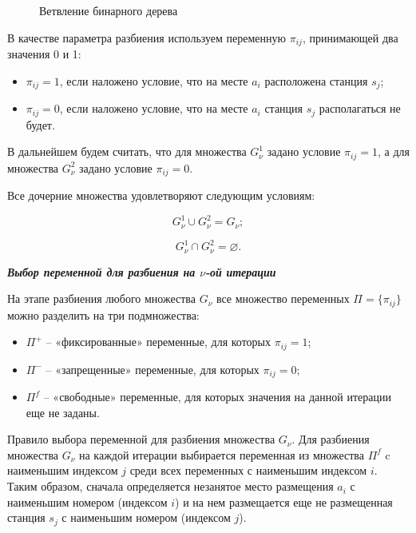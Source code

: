 \begin{figure}[ht]
  \caption{Ветвление бинарного дерева}\label{fig:part2_bst_child_nodes}
\end{figure}

В качестве параметра разбиения используем переменную $\pi_{ij}$, принимающей два значения 0 и 1:

\begin{itemize}
    \item $\pi_{ij}=1$, если наложено условие, что на месте $a_i$ расположена станция $s_j$;
    \item $\pi_{ij} = 0$, если наложено условие, что на месте $a_i$ станция $s_j$  располагаться не будет.
\end{itemize}

В дальнейшем будем считать, что для множества $G^1_\nu$ задано условие $\pi_{ij}=1$, а для множества $G^2_\nu$  задано условие $\pi_{ij} = 0$.

Все дочерние множества удовлетворяют следующим условиям:

\begin{equation}
    \label{eq:part4_G_cup}
    G^1_\nu \cup G^2_\nu = G_\nu;
\end{equation}


\begin{equation}
    \label{eq:part4_G_cap}
    G^1_\nu \cap G^2_\nu = \varnothing.
\end{equation}

\textit{\textbf{Выбор переменной для разбиения на $\nu$-ой итерации}}

На этапе разбиения любого множества $G_\nu$ все множество переменных $\Pi = \{\pi_{ij}\}$ можно разделить на три подмножества: 

\begin{itemize}
  \item $\Pi^+$ -- «фиксированные» переменные, для которых $\pi_{ij}=1$;
  \item $\Pi^-$ -- «запрещенные» переменные, для которых $\pi_{ij}=0$;
  \item $\Pi^f$ -- «свободные» переменные, для которых значения на данной итерации еще не заданы.
\end{itemize}
Правило выбора переменной для разбиения множества $G_\nu$. Для разбиения множества $G_\nu$ на каждой итерации выбирается переменная из множества $\Pi^f$ c наименьшим индексом $j$ среди всех переменных с наименьшим индексом $i$. Таким образом, сначала определяется незанятое место размещения $a_i$ с наименьшим номером (индексом $i$) и на нем размещается еще не размещенная станция $s_j$ с наименьшим номером (индексом $j$).

